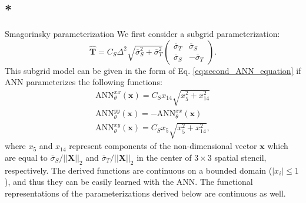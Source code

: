 \documentclass[draft,grl]{agutexSI2019}
\begin{document}
\begin{article}
\subsection{*}{Smagorinsky parameterization}
We first consider a  subgrid parameterization:
\begin{equation}
    \widehat{\mathbf{T}} =   C_S \Delta^2 \sqrt{\overline{\sigma}_S^2 + \overline{\sigma}_T^2} \begin{pmatrix}
    \overline{\sigma}_T & \overline{\sigma}_S \\
    \overline{\sigma}_S & -\overline{\sigma}_T
    \end{pmatrix}.
\end{equation}
This subgrid model can be given in the form of Eq. \eqref{eq:second_ANN_equation} if ANN parameterizes the following functions:
\begin{gather}
    \mathrm{ANN}_{\theta}^{xx}(\mathbf{x}) = C_S x_{14} \sqrt{x_5^2 + x_{14}^2} \\
    \mathrm{ANN}_{\theta}^{yy}(\mathbf{x}) = - \mathrm{ANN}_{\theta}^{xx}(\mathbf{x}) \\
    \mathrm{ANN}_{\theta}^{xy}(\mathbf{x}) = C_S x_{5} \sqrt{x_5^2 + x_{14}^2},
\end{gather}
where $x_5$ and $x_{14}$ represent components of the non-dimensional vector $\mathbf{x}$ which are equal to $\overline{\sigma}_S / ||\mathbf{X}||_2$  and $\overline{\sigma}_T / ||\mathbf{X}||_2$ in the center of $3 \times 3$ spatial stencil, respectively. The derived functions are continuous on a bounded domain ($|x_i|\leq 1$), and thus they can be easily learned with the ANN. The functional representations of the parameterizations derived below are continuous as well.


\end{article}
\end{document}
